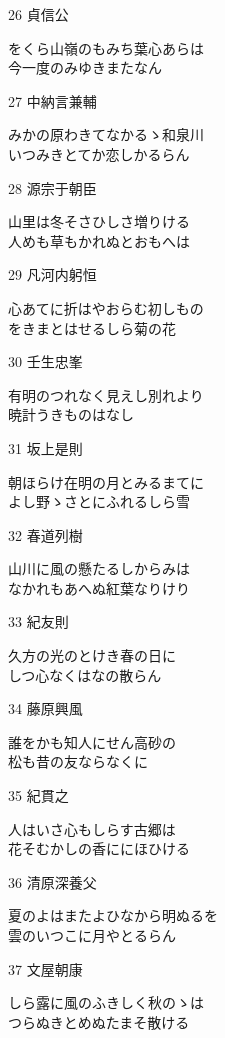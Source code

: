\begin{shiika}
\end{shiika}26 貞信公       \begin{shiika}をくら山嶺のもみち葉心あらは\\今一度のみゆきまたなん 
\end{shiika}27 中納言兼輔   \begin{shiika}みかの原わきてなかるゝ和泉川\\いつみきとてか恋しかるらん 
\end{shiika}28 源宗于朝臣   \begin{shiika}山里は冬そさひしさ増りける\\人めも草もかれぬとおもへは 
\end{shiika}29 凡河内躬恒   \begin{shiika}心あてに折はやおらむ初しもの\\をきまとはせるしら菊の花 
\end{shiika}30 壬生忠峯     \begin{shiika}有明のつれなく見えし別れより\\暁計うきものはなし 
\end{shiika}31 坂上是則     \begin{shiika}朝ほらけ在明の月とみるまてに\\よし野ゝさとにふれるしら雪 
\end{shiika}32 春道列樹     \begin{shiika}山川に風の懸たるしからみは\\なかれもあへぬ紅葉なりけり 
\end{shiika}33 紀友則       \begin{shiika}久方の光のとけき春の日に\\しつ心なくはなの散らん 
\end{shiika}34 藤原興風     \begin{shiika}誰をかも知人にせん高砂の\\松も昔の友ならなくに 
\end{shiika}35 紀貫之       \begin{shiika}人はいさ心もしらす古郷は\\花そむかしの香ににほひける 
\end{shiika}36 清原深養父   \begin{shiika}夏のよはまたよひなから明ぬるを\\雲のいつこに月やとるらん 
\end{shiika}37 文屋朝康     \begin{shiika}しら露に風のふきしく秋のゝは\\つらぬきとめぬたまそ散ける 

\end{shiika}
